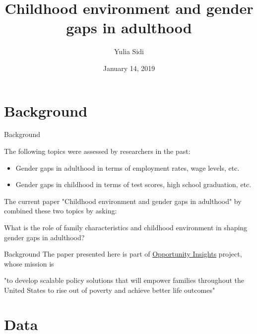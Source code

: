 \documentclass{beamer}
\title[Gender Gaps]{Childhood environment and gender gaps in adulthood}
\author[Yulia Sidi]{{\footnotesize Yulia Sidi}}
\institute[UConn]{Applied General Exam \\ 
Department of Statistics, University of Connecticut}
\date[January 14, 2019]{{\scriptsize January 14, 2019}}
\begin{document}
\begin{frame}
\titlepage
\end{frame}


\section{Background}

\begin{frame}{Background}

The following topics were assessed by researchers in the past:
 
 \begin{itemize}
 	\item Gender gaps in adulthood in terms of employment rates, wage levels, etc.
 	\item Gender gaps in childhood in terms of test scores, high school graduation, etc.  
 \end{itemize}

The current paper "Childhood environment and gender gaps in adulthood" by \cite{chetty2016childhood} combined these two topics by asking:


\begin{block}{}
	\centering
	What is the role of family characteristics and childhood environment in shaping gender gaps in adulthood?
\end{block}

\end{frame}

\begin{frame}{Background}
The paper presented here is part of \href{https://opportunityinsights.org/}{Opportunity Insights} project, whose mission is 
\begin{block}{}
	\centering
	"to develop scalable policy solutions that will empower families throughout the United States to rise out of poverty and achieve better life outcomes"
\end{block} 

\end{frame}


\section{Data}
\end{document}
